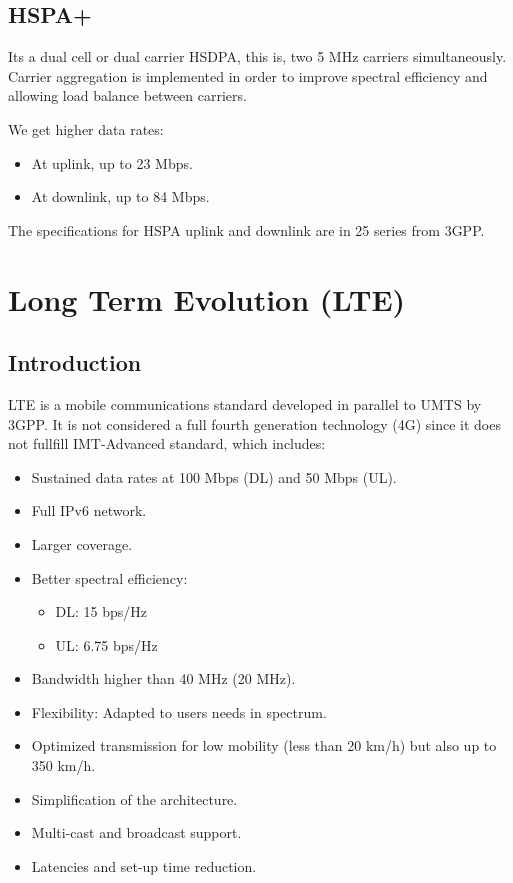 \documentclass[../main.tex]{subfiles}
\begin{document}
\subsection{HSPA+}

Its a dual cell or dual carrier HSDPA, this is, two 5 MHz carriers simultaneously. Carrier aggregation is implemented in order to improve spectral efficiency and allowing load balance between carriers.

We get higher data rates:
\begin{itemize}
	\item At uplink, up to 23 Mbps.
	\item At downlink, up to 84 Mbps.
\end{itemize}

The specifications for HSPA uplink and downlink are in 25 series from 3GPP.

\section{Long Term Evolution (LTE)}

\subsection{Introduction}

LTE is a mobile communications standard developed in parallel to UMTS by 3GPP. It is not considered a full fourth generation technology (4G) since it does not fullfill IMT-Advanced standard, which includes:
\begin{itemize}
	\item Sustained data rates at 100 Mbps (DL) and 50 Mbps (UL).
	\item Full IPv6 network.
	\item Larger coverage.
	\item {
		Better spectral efficiency:
		\begin{itemize}
			\item DL: 15 bps/Hz
			\item UL: 6.75 bps/Hz
		\end{itemize}
	}
	\item Bandwidth higher than 40 MHz (20 MHz).
	\item Flexibility: Adapted to users needs in spectrum.
	\item Optimized transmission for low mobility (less than 20 km/h) but also up to 350 km/h.
	\item Simplification of the architecture.
	\item Multi-cast and broadcast support.
	\item Latencies and set-up time reduction.
\end{itemize}
\end{document}
